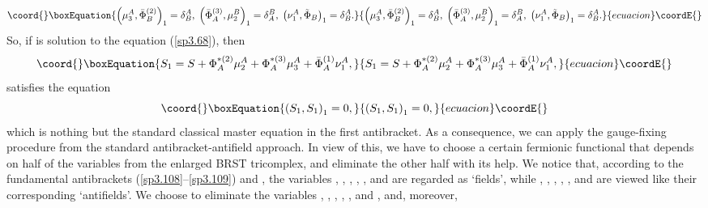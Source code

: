 \documentclass[a4paper,12pt]{article}
\begin{document}
\begin{equation}\coord{}\boxEquation{
\left( \mu _{3}^{A},\bar{\Phi}_{B}^{(2)}\right) _{1}=\delta
_{B}^{A},\;\left( \bar{\Phi}_{A}^{(3)},\mu _{2}^{B}\right) _{1}=\delta
_{A}^{B},\;\left( \nu _{1}^{A},\tilde{\Phi}_{B}\right) _{1}=\delta _{B}^{A}.
\label{sp3.109}
}{
\left( \mu _{3}^{A},\bar{\Phi}_{B}^{(2)}\right) _{1}=\delta
_{B}^{A},\;\left( \bar{\Phi}_{A}^{(3)},\mu _{2}^{B}\right) _{1}=\delta
_{A}^{B},\;\left( \nu _{1}^{A},\tilde{\Phi}_{B}\right) _{1}=\delta _{B}^{A}.
}{ecuacion}\coordE{}\end{equation}
So, if \coordHE{} is solution to the equation (\ref{sp3.68}), then 
\begin{equation}\coord{}\boxEquation{
S_{1}=S+\Phi _{A}^{*(2)}\mu _{2}^{A}+\Phi _{A}^{*(3)}\mu _{3}^{A}+\bar{\Phi}
_{A}^{(1)}\nu _{1}^{A},  \label{sp3.109a}
}{
S_{1}=S+\Phi _{A}^{*(2)}\mu _{2}^{A}+\Phi _{A}^{*(3)}\mu _{3}^{A}+\bar{\Phi}
_{A}^{(1)}\nu _{1}^{A},  }{ecuacion}\coordE{}\end{equation}
satisfies the equation 
\begin{equation}\coord{}\boxEquation{
\left( S_{1},S_{1}\right) _{1}=0,  \label{sp3.109b}
}{
\left( S_{1},S_{1}\right) _{1}=0,  }{ecuacion}\coordE{}\end{equation}
which is nothing but the standard classical master equation in the first
antibracket. As a consequence, we can apply the gauge-fixing procedure from
the standard antibracket-antifield approach. In view of this, we have to
choose a certain fermionic functional \coordHE{} that depends on half of
the variables from the enlarged BRST tricomplex, and eliminate the other
half with its help. We notice that, according to the fundamental
antibrackets (\ref{sp3.108}--\ref{sp3.109}) and \coordHE{}, the variables \coordHE{}, \coordHE{}, \coordHE{}, \coordHE{}, \coordHE{}, \coordHE{} and \coordHE{} are regarded as `fields', while \coordHE{}, \coordHE{}, \coordHE{}, \coordHE{}, \coordHE{}, \coordHE{} and \coordHE{} are viewed like
their corresponding `antifields'. We choose to eliminate the variables \coordHE{}, \coordHE{}, \coordHE{}, \coordHE{}, \coordHE{}, \coordHE{} and \coordHE{}, and, moreover,
\end{document}
